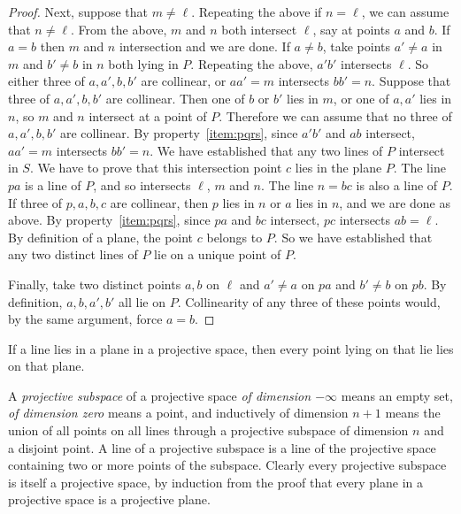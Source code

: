 \begin{proof}
Next, suppose that \(m \ne \ell\).
Repeating the above if \(n=\ell\), we can assume that \(n \ne \ell\).
From the above, \(m\) and \(n\) both intersect \(\ell\), say at points \(a\) and \(b\).
If \(a=b\) then \(m\) and \(n\) intersection and we are done.
If \(a \ne b\), take points \(a' \ne a\) in \(m\) and \(b' \ne b\) in \(n\) both lying in \(P\).
Repeating the above, \(a'b'\) intersects \(\ell\).
So either three of \(a, a', b, b'\) are collinear, or \(aa'=m\) intersects \(bb'=n\).
Suppose that three of \(a, a', b, b'\) are collinear.
Then one of \(b\) or \(b'\) lies in \(m\), or one of \(a, a'\) lies in \(n\), so \(m\) and \(n\) intersect at a point of \(P\).
Therefore we can assume that no three of \(a, a', b, b'\) are collinear.
By property~\vref{item:pqrs}, since \(a'b'\) and \(ab\) intersect, \(aa'=m\) intersects \(bb'=n\).
We have established that any two lines of \(P\) intersect in \(S\).
We have to prove that this intersection point \(c\) lies in the plane \(P\).
The line \(pa\) is a line of \(P\), and so intersects \(\ell\), \(m\) and \(n\).
The line \(n=bc\) is also a line of \(P\).
If three of \(p, a, b, c\) are collinear, then \(p\) lies in \(n\) or \(a\) lies in \(n\), and we are done as above.
By property~\vref{item:pqrs}, since \(pa\) and \(bc\) intersect, \(pc\) intersects \(ab=\ell\).
By definition of a plane, the point \(c\) belongs to \(P\).
So we have established that any two distinct lines of \(P\) lie on a unique point of \(P\).

Finally, take two distinct points \(a,b\) on \(\ell\) and \(a' \ne a\) on \(pa\) and \(b' \ne b\) on \(pb\).
By definition, \(a, b, a', b'\) all lie on \(P\).
Collinearity of any three of these points would, by the same argument, force \(a=b\).
\end{proof}


\begin{corollary}
If a line lies in a plane in a projective space, then every point lying on that lie lies on that plane.
\end{corollary}

A \emph{projective subspace} of a projective space \emph{of dimension \(-\infty\)} means an empty set, \emph{of dimension zero} means a point, and inductively of dimension \(n+1\) means the union of all points on all lines through a projective subspace of dimension \(n\) and a disjoint point.
A line of a projective subspace is a line of the projective space containing two or more points of the subspace.
Clearly every projective subspace is itself a projective space, by induction from the proof that every plane in a projective space is a projective plane.

